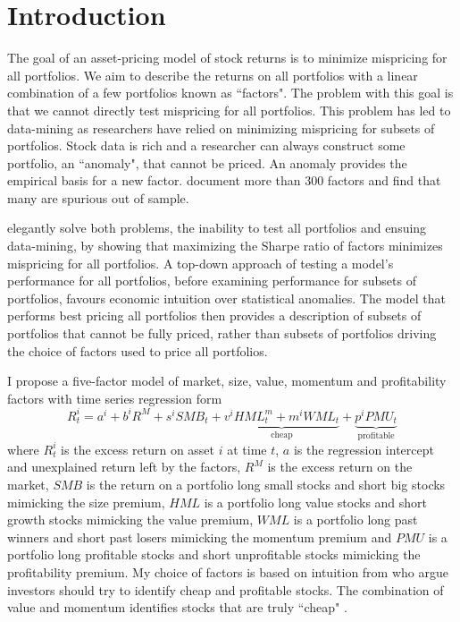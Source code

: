 
\section*{Introduction}

The goal of an asset-pricing model of stock returns is to
minimize mispricing for all portfolios.
We aim to describe the returns on all portfolios
with a linear combination of a few portfolios known as ``factors".
The problem with this goal is that we cannot directly test
mispricing for all portfolios.
This problem has led to data-mining as researchers have relied on minimizing
mispricing for subsets of portfolios.
Stock data is rich and a researcher can always construct some portfolio,
an ``anomaly", that cannot be priced.
An anomaly provides the empirical basis for a new factor.
\textcite{harvey2016and} document more than 300 factors and
\textcite{linnainmaa2016history} find that many are spurious out of sample.

\textcite{barillas2016alpha} elegantly solve both problems,
the inability to test all portfolios and ensuing data-mining,
by showing that maximizing the Sharpe ratio of factors minimizes
mispricing for all portfolios.
A top-down approach of testing a model's performance for all portfolios,
before examining performance for subsets of portfolios,
favours economic intuition over statistical anomalies.
The model that performs best pricing all portfolios then provides a description
of subsets of portfolios that cannot be fully priced,
rather than subsets of portfolios driving
the choice of factors used to price all portfolios.

I propose a five-factor model of market, size, value, momentum and
profitability factors with time series regression form
\begin{equation} \label{eq:B16}
R_t^i = a^i+b^iR^M+s^iSMB_t+
\underbrace{v^iHML_t^m+m^iWML_t}_\text{cheap}+
\underbrace{p^iPMU_t}_\text{profitable}
\end{equation}
where $R_t^i$ is the excess return on asset $i$ at time $t$, $a$ is the
regression intercept and unexplained return left by the factors, $R^M$ is the
excess return on the market, $SMB$ is the return on a portfolio long small
stocks and short big stocks mimicking the size premium, $HML$ is a portfolio
long value stocks and short growth stocks mimicking the value premium, $WML$ is
a portfolio long past winners and short past losers mimicking the momentum
premium and $PMU$ is a portfolio long profitable stocks and short unprofitable
stocks mimicking the profitability premium.
My choice of factors is based on intuition from \textcite{graham1934security}
who argue investors should try to identify cheap and profitable stocks.
The combination of value and momentum identifies stocks that are truly ``cheap"
\parencite{kok2017facts}.


